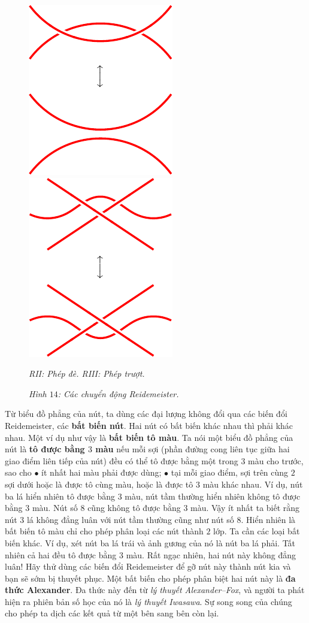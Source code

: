 \begin{multicols}{2}
\begin{figure}[H]
		\includegraphics[width= 0.35\linewidth]{R2.pdf}\quad
		\includegraphics[width= 0.35\linewidth]{R3.pdf}
		\caption{\small\textit{\color{duongvaotoanhoc}RII: Phép đè.\hspace*{30pt} RIII: Phép trượt.}}
		\caption{\small\textit{\color{duongvaotoanhoc}Hình $14$: Các chuyển động Reidemeister.}}
		\vspace*{-10pt}
	\end{figure}
	Từ biểu đồ phẳng của nút, ta dùng các đại lượng không đổi qua các biến đổi Reidemeister, các {\bf\color{duongvaotoanhoc} bất biến nút}. Hai nút có bất biến khác nhau thì phải khác nhau. Một ví dụ như vậy là {\bf\color{duongvaotoanhoc} bất biến tô màu}. Ta nói một biểu đồ phẳng của nút là {\bf\color{duongvaotoanhoc} tô được bằng $3$ màu} nếu mỗi sợi (phần đường cong liên tục giữa hai giao điểm liên tiếp của nút) đều có thể tô được bằng một trong $3$ màu cho trước, sao cho
	\vskip 0.1cm
	$\bullet$ ít nhất hai màu phải được dùng;
	\vskip 0.1cm
	$\bullet$ tại mỗi giao điểm, sợi trên cùng $2$ sợi dưới hoặc là được tô cùng màu, hoặc là được tô $3$ màu khác nhau.
	\vskip 0.1cm
	Ví dụ, nút ba lá hiển nhiên tô được bằng $3$ màu, nút tầm thường hiển nhiên không tô được bằng $3$ màu. Nút số $8$ cũng không tô được bằng $3$ màu. Vậy ít nhất ta biết rằng nút $3$ lá không đẳng luân với nút tầm thường cũng như nút số $8$.
	\vskip 0.1cm
	Hiển nhiên là bất biến tô màu chỉ cho phép phân loại các nút thành $2$ lớp. Ta cần các loại bất biến khác. Ví dụ, xét nút ba lá trái và ảnh gương của nó là nút ba lá phải. Tất nhiên cả hai đều tô được bằng $3$ màu. Rất ngạc nhiên, hai nút này không đẳng luân! Hãy thử dùng các biến đổi Reidemeister để gỡ nút này thành nút kia và bạn sẽ sớm bị thuyết phục. Một bất biến cho phép phân biệt hai nút này là {\bf\color{duongvaotoanhoc} đa thức Alexander}. Đa thức này đến từ {\it lý thuyết Alexander--Fox}, và người ta phát hiện ra phiên bản số học của nó là {\it lý thuyết Iwasawa}. Sự song song của chúng cho phép ta dịch các kết quả từ một bên sang bên còn lại.

\end{multicols}
